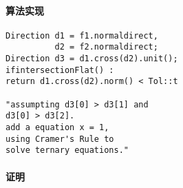 \documentclass[a4paper]{book}
\numberwithin{equation}{chapter}
\theoremstyle{definition}
\begin{document}
\begin{multicols}{2}
\paragraph{算法实现}
\begin{lstlisting}
Direction d1 = f1.normaldirect,
		  d2 = f2.normaldirect;
Direction d3 = d1.cross(d2).unit(); 
ifintersectionFlat() :
return d1.cross(d2).norm() < Tol::t

"assumpting d3[0] > d3[1] and 
d3[0] > d3[2].
add a equation x = 1,
using Cramer's Rule to 
solve ternary equations."

\end{lstlisting}
\paragraph{证明}




\end{multicols}
\end{document}
